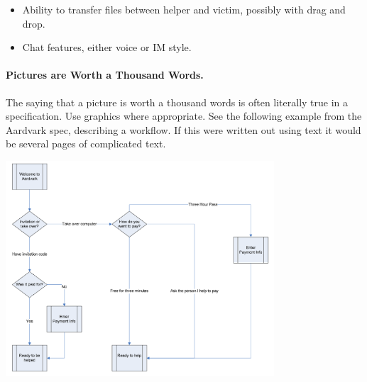 \begin{itemize}
	\item Ability to transfer files between helper and victim, possibly with drag and drop.
	\item Chat features, either voice or IM style.
\end{itemize}

\paragraph{Pictures are Worth a Thousand Words.}
The saying that a picture is worth a thousand words is often literally true in a specification. Use graphics where appropriate. See the following example from the Aardvark spec, describing a workflow. If this were written out using text it would be several pages of complicated text.

\begin{center}
	\includegraphics[width=0.75\textwidth]{images/aardvarksite.png}
\end{center}





